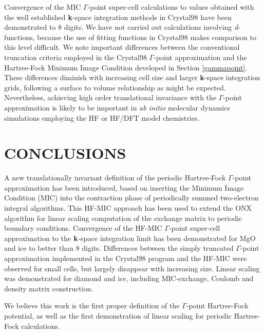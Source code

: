 \documentclass[prb,aps,nobibnotes,twocolumn,doublespace,twocolumngrid,superbib]{revtex4}
\begin{document}
Convergence of the MIC $\Gamma$-point super-cell calculations to values obtained with 
the well established {{\bf k}}-space integration methods in {\sc Crystal98} have been 
demonstrated to 8 digits.  We have not carried out calculations involving 
{\it d}-functions, because the use of fitting functions in {\sc Crystal98} makes
comparison to this level difficult.  We note important differences between the 
conventional truncation criteria employed in the {\sc Crystal98} $\Gamma$-point
approximation and the Hartree-Fock Minimum Image Condition developed in Section 
\ref{gammapoint}.  These differences diminish with increasing cell size and larger 
{\bf k}-space integration grids, following a surface to volume relationship 
as might be expected. 
Nevertheless, achieving high order translational invariance 
with the $\Gamma$-point approximation is likely to be important in {\em ab initio} 
molecular dynamics simulations employing the HF or HF/DFT model chemistries.


\section{CONCLUSIONS}

A new translationally invariant definition of the periodic Hartree-Fock 
$\Gamma$-point approximation has been introduced, based on inserting 
the Minimum Image Condition (MIC) into the contraction phase of periodically
summed two-electron integral algorithms.  This HF-MIC approach has been used 
to extend the {\sc ONX} algorithm for linear scaling computation of the exchange 
matrix to periodic boundary conditions.  Convergence of the HF-MIC $\Gamma$-point
super-cell approximation to the ${\bf k}$-space integration limit has been 
demonstrated for MgO and ice to better than 8 digits.  Differences between
the simply truncated $\Gamma$-point approximation implemented in the 
{\sc Crystal98} program and the HF-MIC were observed for small cells, but
largely disappear with increasing size. Linear scaling was demonstrated for
diamond and ice, including MIC-exchange, Coulomb and density matrix 
construction.   

We believe this work is the first proper definition of the $\Gamma$-point
Hartree-Fock potential, as well as the first demonstration of linear scaling
for periodic Hartree-Fock calculations.
\end{document}
